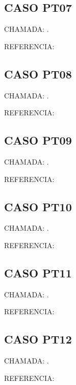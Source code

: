 \documentclass{undftex}
\begin{document}
\begin{refsection}\section*{CASO PT07} CHAMADA: . \textcite{pt07}\par REFERENCIA:\par\printbibliography[heading=none,check=undfconsultadas]\end{refsection}\clearpage
\begin{refsection}\section*{CASO PT08} CHAMADA: . \textcite{pt08}\par REFERENCIA:\par\printbibliography[heading=none,check=undfconsultadas]\end{refsection}\clearpage
\begin{refsection}\section*{CASO PT09} CHAMADA: . \textcite{pt09}\par REFERENCIA:\par\printbibliography[heading=none,check=undfconsultadas]\end{refsection}\clearpage
\begin{refsection}\section*{CASO PT10} CHAMADA: . \textcite{pt10}\par REFERENCIA:\par\printbibliography[heading=none,check=undfconsultadas]\end{refsection}\clearpage
\begin{refsection}\section*{CASO PT11} CHAMADA: . \textcite{pt11}\par REFERENCIA:\par\printbibliography[heading=none,check=undfconsultadas]\end{refsection}\clearpage
\begin{refsection}\section*{CASO PT12} CHAMADA: . \textcite{pt12}\par REFERENCIA:\par\printbibliography[heading=none,check=undfconsultadas]\end{refsection}\clearpage
\end{document}
